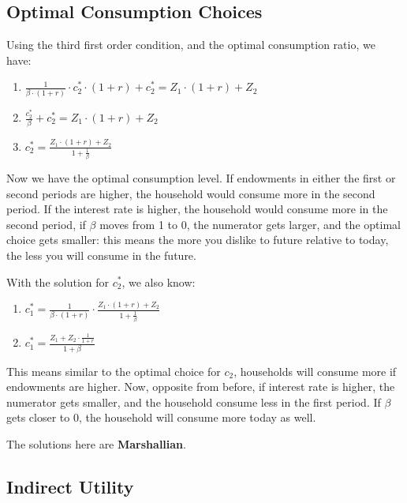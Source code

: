\documentclass[
]{book}
\begin{document}
\hypertarget{optimal-consumption-choices}{%
\subsection{Optimal Consumption Choices}\label{optimal-consumption-choices}}

Using the third first order condition, and the optimal consumption
ratio, we have:

\begin{enumerate}
\def\labelenumi{\arabic{enumi}.}
\item
  \(\displaystyle \frac{1}{\beta \cdot (1+r)}\cdot c_2^{\ast } \cdot (1+r)+c_2^{\ast } =Z_1 \cdot (1+r)+Z_2\)
\item
  \(\displaystyle \frac{c_2^{\ast } }{\beta }+c_2^{\ast } =Z_1 \cdot (1+r)+Z_2\)
\item
  \(\displaystyle c_2^{\ast } =\frac{Z_1 \cdot (1+r)+Z_2 }{1+\frac{1}{\beta }}\)
\end{enumerate}

Now we have the optimal consumption level. If endowments in either the
first or second periods are higher, the household would consume more in
the second period. If the interest rate is higher, the household would
consume more in the second period, if \(\beta\) moves from 1 to 0, the
numerator gets larger, and the optimal choice gets smaller: this means
the more you dislike to future relative to today, the less you will
consume in the future.

With the solution for \(c_2^{\ast }\), we also know:

\begin{enumerate}
\def\labelenumi{\arabic{enumi}.}
\item
  \(\displaystyle c_1^{\ast } =\frac{1}{\beta \cdot (1+r)}\cdot \frac{Z_1 \cdot (1+r)+Z_2 }{1+\frac{1}{\beta }}\)
\item
  \(\displaystyle c_1^{\ast } =\frac{Z_1 +Z_2 \cdot \frac{1}{1+r}}{1+\beta }\)
\end{enumerate}

This means similar to the optimal choice for \(c_2\), households will
consume more if endowments are higher. Now, opposite from before, if
interest rate is higher, the numerator gets smaller, and the household
consume less in the first period. If \(\beta\) gets closer to 0, the
household will consume more today as well.

The solutions here are \textbf{Marshallian}.

\hypertarget{indirect-utility}{%
\subsection{Indirect Utility}\label{indirect-utility}}
\end{document}
